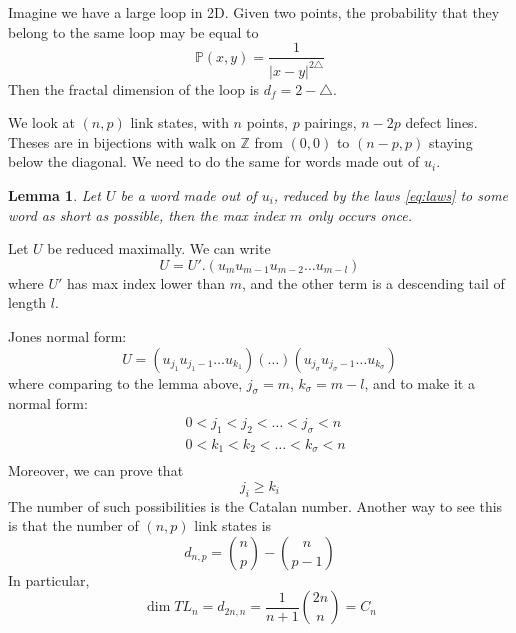 \documentclass[a4paper]{book}
\newtheorem{lemma}[theorem]{Lemma}
\theoremstyle{definition}
\theoremstyle{remark}
\begin{document}
Imagine we have a large loop in 2D. Given two points, the probability that they belong to the same loop may be equal to 
\begin{equation}
    \mathbb{P}(x, y) = \frac{1}{|x-y|^{2\triangle}}
\end{equation}
Then the fractal dimension of the loop is $d_f = 2-\triangle$. \par \medskip 

We look at $(n,p)$ link states, with $n$ points, $p$ pairings, $n-2p$ defect lines. Theses are in bijections with walk on $\mathbb{Z}$ from $(0, 0)$ to $(n-p,p)$ staying below the diagonal. We need to do the same for words made out of $u_i$. 

\begin{lemma}
    Let $U$ be a word made out of $u_i$, reduced by the laws \eqref{eq:laws} to some word as short as possible, then the max index $m$ only occurs once. 
\end{lemma}
Let $U$ be reduced maximally. We can write 
\begin{equation}
    U = U' . (u_m u_{m-1} u_{m-2} \dots u_{m-l})
\end{equation}
where $U'$ has max index lower than $m$, and the other term is a descending tail of length $l$. \par \medskip 

Jones normal form: 
\begin{equation}
    U = (u_{j_1} u_{j_1 - 1} \dots u_{k_1}) (\dots ) (u_{j_\sigma} u_{j_\sigma - 1}\dots u_{k_\sigma})
\end{equation}
where comparing to the lemma above, $j_\sigma = m$, $k_\sigma = m-l$, and to make it a normal form: 
\begin{equation}
    \begin{aligned}
        &0 < j_1 < j_2 < \dots < j_\sigma < n \\ 
        &0 < k_1 < k_2 < \dots < k_\sigma < n \\ 
    \end{aligned}
\end{equation}
Moreover, we can prove that 
\begin{equation}
    j_i \geq k_i
\end{equation}
The number of such possibilities is the Catalan number. Another way to see this is that the number of $(n,p)$ link states is 
\begin{equation}
    d_{n,p} = \binom{n}{p} - \binom{n}{p-1}
\end{equation}
In particular, 
\begin{equation}
    \dim TL_n = d_{2n,n} = \frac{1}{n+1}\binom{2n}{n} = C_n
\end{equation}
\end{document}
